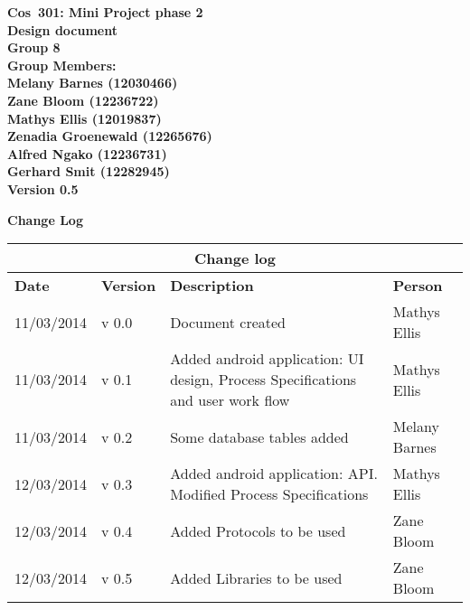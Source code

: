 \documentclass[12pt]{article}
\newcommand{\Title}{Design document} %
\newcommand{\Class}{Cos\ 301} %
\begin{document}
	\vspace{4em}
	
	\begin{center}%
	\LARGE \bf \Class: Mini Project phase 2 \\
	  \LARGE \bf \Title \\[4em]
	  \LARGE {\bf Group 8}\\[1em]
	  \LARGE {\bf Group Members:}\\[2em]
	  \large
	     Melany Barnes					(12030466) \\[1em]
	     Zane Bloom						(12236722) \\[1em]
	     Mathys Ellis					(12019837) \\[1em]
	     Zenadia Groenewald				(12265676) \\[1em]
	     Alfred Ngako					(12236731) \\[1em]
	  	 Gerhard Smit					(12282945) \\[1em]
	     {\bf Version 0.5}
	    
	\end{center}
	
	\newpage
		{\LARGE \bf Change Log}\\[2em]
		
		\begin{center}
		\begin{tabular}{|l|p{1.4cm}|p{8cm}|p{2.8cm}|}
		\hline
		\multicolumn{4}{|c|}{\bf Change log} \\
		\hline
		\bf Date & \bf Version & \bf Description & \bf Person \\
		\hline
		11/03/2014 & v 0.0 & Document created & Mathys Ellis \\
		\hline
		11/03/2014 & v 0.1 & Added android application: UI design, Process Specifications and user work flow & Mathys Ellis \\
		\hline
		11/03/2014 & v 0.2 & Some database tables added & Melany Barnes \\
		\hline
		12/03/2014 & v 0.3 & Added android application: API. Modified Process Specifications & Mathys Ellis \\
		\hline
		12/03/2014 & v 0.4 & Added Protocols to be used & Zane Bloom \\
		\hline
		12/03/2014 & v 0.5 & Added Libraries to be used & Zane Bloom \\
		\hline
		\end{tabular}
		\end{center}
		
	\newpage
	\tableofcontents
	
\end{document}
